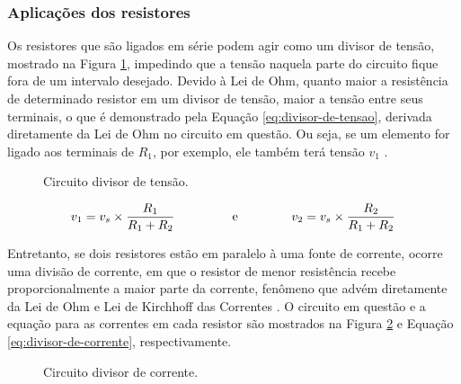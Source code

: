 \documentclass[12pt]{article}
\begin{document}
    \subsubsection{Aplicações dos resistores}
    Os resistores que são ligados em série podem agir como um divisor de tensão, mostrado na Figura \ref{fig:divisor-tensao}, impedindo que a tensão naquela parte do circuito fique fora de um intervalo desejado. Devido à Lei de Ohm, quanto maior a resistência de determinado resistor em um divisor de tensão, maior a tensão entre seus terminais, o que é demonstrado pela Equação \ref{eq:divisor-de-tensao}, derivada diretamente da Lei de Ohm no circuito em questão. Ou seja, se um elemento for ligado aos terminais de $R_1$, por exemplo, ele também terá tensão $v_1$ \parencite[][, p. 65]{nilsson}.
    
    \begin{figure}[H]
        \centering
        \caption{Circuito divisor de tensão.}
        \label{fig:divisor-tensao}
    \end{figure}

    \begin{equation}
        v_1=v_s\times\frac{R_1}{R_1+R_2} \text{\hspace{1.5cm} e\hspace{1.5cm}} v_2=v_s\times\frac{R_2}{R_1+R_2}
        \label{eq:divisor-de-tensao}
    \end{equation}

    Entretanto, se dois resistores estão em paralelo à uma fonte de corrente, ocorre uma divisão de corrente, em que o resistor de menor resistência recebe proporcionalmente a maior parte da corrente, fenômeno que advém diretamente da Lei de Ohm e Lei de Kirchhoff das Correntes \parencite[][, p. 66]{nilsson}. O circuito em questão e a equação para as correntes em cada resistor são mostrados na Figura \ref{fig:divisor-corrente} e Equação \ref{eq:divisor-de-corrente}, respectivamente.
    
    \begin{figure}[H]
        \centering
        \caption{Circuito divisor de corrente.}
        \label{fig:divisor-corrente}
    \end{figure}
\end{document}
